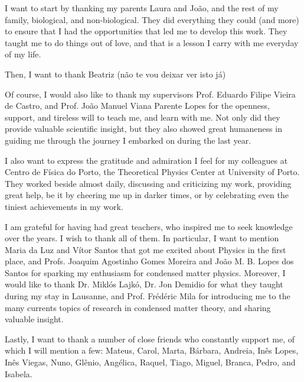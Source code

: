 
\begin{acknowledgments} 

I want to start by thanking my parents Laura and João, and the rest of my family, biological, and non-biological.
They did everything they could (and more) to ensure that I had the opportunities that led me to develop this work.
They taught me to do things out of love, and that is a lesson I carry with me everyday of my life.

Then, I want to thank Beatriz
(não te vou deixar ver isto já)

Of course, I would also like to thank my supervisors Prof. Eduardo Filipe Vieira de Castro, and Prof. João Manuel Viana Parente Lopes for the openness, support, and tireless will to teach me, and learn with me.
Not only did they provide valuable scientific insight, but they also showed great humaneness in guiding me through the journey I embarked on during the last year.

I also want to express the gratitude and admiration I feel for my colleagues at Centro de Física do Porto, the Theoretical Physics Center at University of Porto.
They worked beside almost daily, discussing and criticizing my work, providing great help, be it by cheering me up in darker times, or by celebrating even the tiniest achievements in my work.

I am grateful for having had great teachers, who inspired me to seek knowledge over the years. I wish to thank all of them. In particular, I want to mention Maria da Luz and Vítor Santos that got me excited about Physics in the first place, and Profs. Joaquim Agostinho Gomes Moreira and João M. B. Lopes dos Santos for sparking my enthusiasm for condensed matter physics. Moreover, I would like to thank Dr. Miklós Lajkó, Dr. Jon Demidio for what they taught during my stay in Lausanne, and Prof. Frédéric Mila for introducing me to the many currents topics of research in condensed matter theory, and sharing valuable insight.

Lastly, I want to thank a number of close friends who constantly support me, of which I will mention a few: Mateus, Carol, Marta, Bárbara, Andreia, Inês Lopes, Inês Viegas, Nuno, Glênio, Angélica, Raquel, Tiago, Miguel, Branca, Pedro, and Isabela. 

\end{acknowledgments}
\clearpage
\thispagestyle{empty}
\cleardoublepage